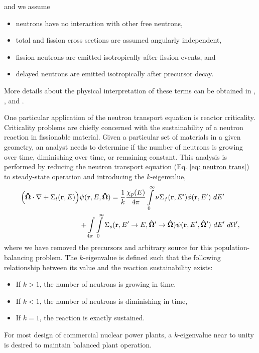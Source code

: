 and we assume
\begin{itemize}
  \item neutrons have no interaction with other free neutrons,
  \item total and fission cross sections are assumed angularly independent,
  \item fission neutrons are emitted isotropically after fission events, and
  \item delayed neutrons are emitted isotropically after precursor decay.
\end{itemize}
More details about the physical interpretation of these terms can be obtained in \cite{duderstadt},
\cite{lewis}, and \cite{lewistrans}.

One particular application of the neutron transport equation is reactor criticality.  Criticality problems are
chiefly concerned with the sustainability of a neutron reaction in fissionable material.  Given a particular
set of materials in a given geometry, an analyst needs to determine if the number of neutrons is growing over
time, diminishing over time, or remaining constant.  This analysis is performed by reducing the neutron
transport equation (Eq. \ref{eq: neutron trans}) to steady-state operation and introducing the $k$-eigenvalue,
\begin{align}\label{eq: neutron k}
  \qty(\mathbf{\hat\Omega}\cdot\nabla +
   \Sigma_t(\mathbf{r},E))&\psi(\mathbf{r},E,\mathbf{\hat\Omega}) =
   \frac{1}{k}\frac{\chi_p(E)}{4\pi}\int\limits_{0}^\infty \nu\Sigma_f(\mathbf{r},E')\phi(\mathbf{r},E')\ dE' \nonumber \\
  & + \int\limits_{4\pi}^{}\int\limits_{0}^\infty \Sigma_s(\mathbf{r},E'\to E,\mathbf{\hat\Omega'\to\hat\Omega})
  \psi(\mathbf{r},E',\mathbf{\hat\Omega'})  \ dE'\ d\Omega',
\end{align}
where we have removed the precursors and arbitrary source for this population-balancing problem.  The
$k$-eigenvalue is defined such that the following relationship between its value and the reaction
sustainability exists:
\begin{itemize}
  \item If $k > 1$, the number of neutrons is growing in time.
  \item If $k < 1$, the number of neutrons is diminishing in time,
  \item If $k = 1$, the reaction is exactly sustained.
\end{itemize}
For most design of commercial nuclear power plants, a $k$-eigenvalue near to unity is desired to maintain balanced
plant operation.

